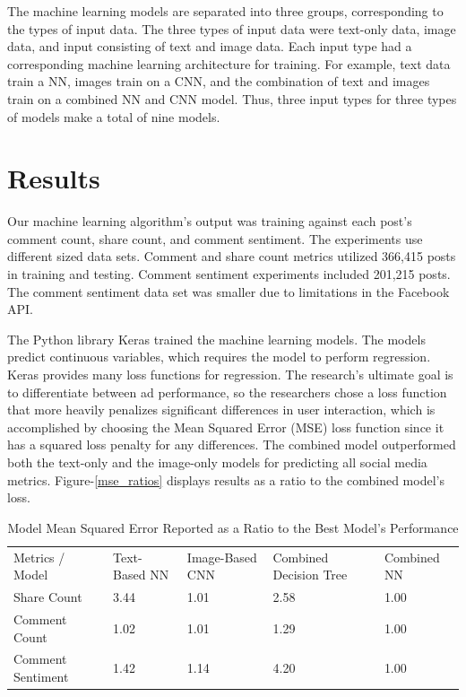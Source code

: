 \documentclass{article}
\begin{document}
The machine learning models are separated into three groups, corresponding to the types of input data. The three types of input data were text-only data, image data, and input consisting of text and image data. Each input type had a corresponding machine learning architecture for training. For example, text data train a NN, images train on a CNN, and the combination of text and images train on a combined NN and CNN model. Thus, three input types for three types of models make a total of nine models.

\section{Results}
Our machine learning algorithm's output was training against each post's comment count, share count, and comment sentiment. The experiments use different sized data sets.  Comment and share count metrics utilized 366,415 posts in training and testing. Comment sentiment experiments included 201,215 posts. The comment sentiment data set was smaller due to limitations in the Facebook API.

The Python library Keras trained the machine learning models. The models predict continuous variables, which requires the model to perform regression. Keras provides many loss functions for regression.  The research's ultimate goal is to differentiate between ad performance, so the researchers chose a loss function that more heavily penalizes significant differences in user interaction, which is accomplished by choosing the Mean Squared Error (MSE) loss function since it has a squared loss penalty for any differences.  The combined model outperformed both the text-only and the image-only models for predicting all social media metrics.  Figure-\ref{mse_ratios} displays results as a ratio to the combined model's loss. 

\begin{table}[]
\centering
\begin{tabular}{lllll}
Metrics / Model & Text-Based NN & Image-Based CNN & Combined Decision Tree & Combined NN \\
Share Count       & 3.44 & 1.01 & 2.58 & 1.00 \\
Comment Count     & 1.02 & 1.01 & 1.29 & 1.00 \\
Comment Sentiment & 1.42 & 1.14 & 4.20 & 1.00
\end{tabular}
\caption{\label{tab:widgets}Model Mean Squared Error Reported as a Ratio to the Best Model's Performance}
\end{table}
\end{document}
